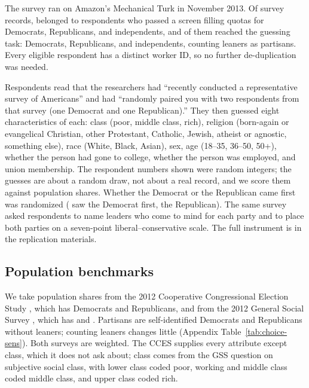 \documentclass[11pt]{article}
\begin{document}
The survey ran on Amazon's Mechanical Turk in November 2013. Of \nRecords{} survey records, \nEligible{} belonged to respondents who passed a screen filling quotas for Democrats, Republicans, and independents, and \nAnalysis{} of them reached the guessing task: \nDem{} Democrats, \nRep{} Republicans, and \nInd{} independents, counting leaners as partisans. Every eligible respondent has a distinct worker ID, so no further de-duplication was needed.

Respondents read that the researchers had ``recently conducted a representative survey of Americans'' and had ``randomly paired you with two respondents from that survey (one Democrat and one Republican).'' They then guessed eight characteristics of each: class (poor, middle class, rich), religion (born-again or evangelical Christian, other Protestant, Catholic, Jewish, atheist or agnostic, something else), race (White, Black, Asian), sex, age (18--35, 36--50, 50+), whether the person had gone to college, whether the person was employed, and union membership. The respondent numbers shown were random integers; the guesses are about a random draw, not about a real record, and we score them against population shares. Whether the Democrat or the Republican came first was randomized (\nDemFirst{} saw the Democrat first, \nRepFirst{} the Republican). The same survey asked respondents to name leaders who come to mind for each party and to place both parties on a seven-point liberal--conservative scale. The full instrument is in the replication materials.

\subsection{Population benchmarks}

We take population shares from the 2012 Cooperative Congressional Election Study \citep{cces2012}, which has \nCcesDem{} Democrats and \nCcesRep{} Republicans, and from the 2012 General Social Survey \citep{gss2012}, which has \nGssDem{} and \nGssRep{}. Partisans are self-identified Democrats and Republicans without leaners; counting leaners changes little (Appendix Table~\ref{tab:choice-sens}). Both surveys are weighted. The CCES supplies every attribute except class, which it does not ask about; class comes from the GSS question on subjective social class, with lower class coded poor, working and middle class coded middle class, and upper class coded rich.
\end{document}
